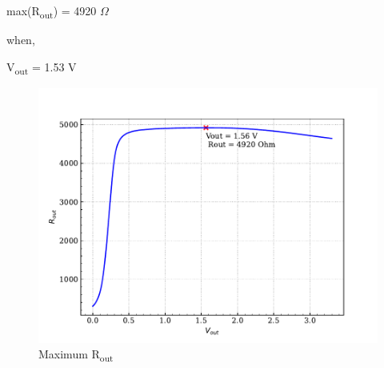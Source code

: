 \documentclass{article}
\begin{document}
max(R\textsubscript{out}) = 4920 \(\Omega\)

when,

V\textsubscript{out} = 1.53 V

\begin{figure}[H]
\centering
\includegraphics[width=.9\linewidth]{img/q6/max-rout.pdf}
\caption{\label{fig:max-rout-q6}Maximum R\textsubscript{out}}
\end{figure}
\end{document}
